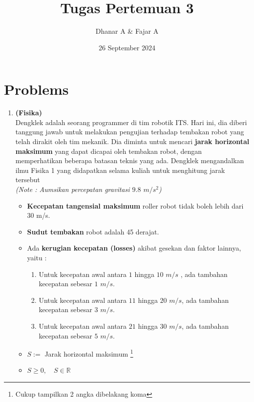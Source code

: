 \documentclass{article}
\title{\textbf{Tugas Pertemuan 3}}
\date{26 September 2024}
\author{Dhanar A \& Fajar A}
\newcommand{\R}{\mathbb{R}}
\begin{document}
    \maketitle

    \section*{Problems}
    \begin{enumerate}[label=\textbf{\arabic*.}]
        \item \textbf{(Fisika)}\\
        Dengklek adalah seorang programmer di tim robotik ITS. Hari ini, dia diberi tanggung jawab untuk melakukan pengujian terhadap tembakan robot yang telah dirakit oleh tim mekanik. Dia diminta untuk mencari \textbf{jarak horizontal maksimum} yang dapat dicapai oleh tembakan robot, dengan memperhatikan beberapa batasan teknis yang ada. Dengklek mengandalkan ilmu Fisika 1 yang didapatkan selama kuliah untuk menghitung jarak tersebut \\
        \textit{ (Note : Aumsikan percepatan gravitasi $9.8$ $m/s^2$)} 
        \begin{req}
            \begin{itemize}
                \item \textbf{Kecepatan tangensial maksimum} roller robot tidak boleh lebih dari 30 m/s.
                \item \textbf{Sudut tembakan} robot adalah 45 derajat.
                \item Ada \textbf{kerugian kecepatan (losses)} akibat gesekan dan faktor lainnya, yaitu :
                \begin{enumerate}
                    \item Untuk kecepatan awal antara $1$ hingga $10$ $m/s$ , ada tambahan kecepatan sebesar $1$ $m/s$.
                    \item Untuk kecepatan awal antara $11$ hingga $20$ $m/s$, ada tambahan kecepatan sebesar $3$ $m/s$.
                    \item Untuk kecepatan awal antara $21$ hingga $30$ $m/s$, ada tambahan kecepatan sebesar $5$ $m/s$.
                \end{enumerate}
            \end{itemize}
        \end{req}

        \begin{out}
            \begin{itemize}
                \item $S:=$ Jarak horizontal maksimum \footnote{Cukup tampilkan 2 angka dibelakang koma}
                \item $S \geq 0, \quad S \in \R$
            \end{itemize}
        \end{out}   
        

\end{enumerate}
\end{document}
